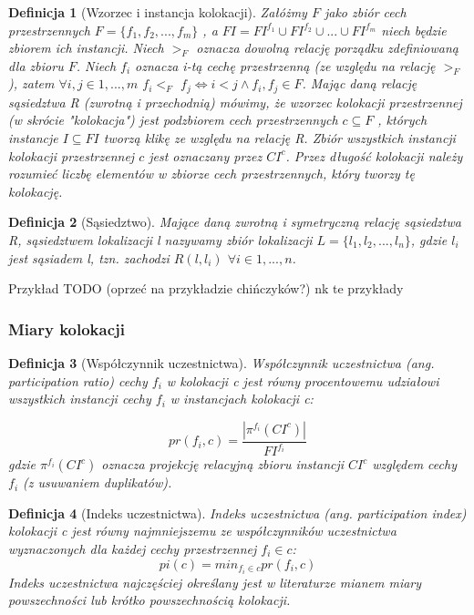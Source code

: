 \documentclass[12pt]{article}
\newtheorem{defin}{Definicja}
\begin{document}
\begin{defin}[Wzorzec i instancja kolokacji]
Załóżmy $F$ jako zbiór cech przestrzennych $F = \{ f_{1}, f_{2}, ...,f_{m} \} $ , a $FI = FI^{f_{1}} \cup FI^{f_{2}} \cup ... \cup FI^{f_{m}}$ niech będzie
zbiorem ich instancji. Niech $ >_{F} $ oznacza dowolną relację porządku zdefiniowaną dla zbioru $ F $. Niech $ f_{i} $ oznacza i-tą cechę przestrzenną (ze względu na relację $ >_{F} $), zatem $ \forall i,j \in 1,...,m $ $ f_{i} <_{F} $ $ f_{j} \Leftrightarrow i < j \land f_{i},f_{j} \in F $. Mając daną relację sąsiedztwa R (zwrotną i przechodnią) mówimy, że wzorzec kolokacji przestrzennej (w skrócie "kolokacja") jest podzbiorem cech przestrzennych $ c \subseteq F $ , których instancje $ I\subseteq FI $ tworzą klikę ze względu na relację R. Zbiór wszystkich instancji kolokacji przestrzennej $c$ jest oznaczany przez $CI^{c} $. Przez długość kolokacji należy rozumieć liczbę elementów w zbiorze cech przestrzennych, który tworzy tę kolokację.
\end{defin}

\begin{defin}[Sąsiedztwo]
Mające daną zwrotną i symetryczną relację sąsiedztwa R, sąsiedztwem lokalizacji l nazywamy zbiór lokalizacji $L = \{l_{1},l_{2}, . . . , l_{n}\}$, gdzie $l_{i}$ jest sąsiadem l, tzn. zachodzi $R(l, l_{i}) $ $ \forall i \in 1,...,n$.
\end{defin}

Przykład TODO (oprzeć na przykładzie chińczyków?) nk te przykłady

\subsubsection{Miary kolokacji}

\begin{defin}[Współczynnik uczestnictwa]
Współczynnik uczestnictwa (ang. participation ratio) cechy $ f_{i} $ w kolokacji c jest równy procentowemu udziałowi wszystkich instancji cechy $ f_{i} $ w instancjach kolokacji c:

\begin{equation}
pr(f_{i}, c) = \frac{|\pi^{f_{i}}(CI^{c})|}{FI^{f_{i}}}
\end{equation}
gdzie $ \pi^{f_{i}}(CI^{c})$ oznacza projekcję relacyjną zbioru instancji $ CI^{c}$ względem cechy $f_{i}$ (z usuwaniem duplikatów).
\end{defin}

\begin{defin}[Indeks uczestnictwa]Indeks uczestnictwa (ang. participation index) kolokacji c jest równy najmniejszemu ze współczynników uczestnictwa wyznaczonych dla każdej cechy przestrzennej $ f_{i} \in c$:
\begin{equation}
pi(c) = min_{f_{i} \in c} pr(f_{i} ,c)
\end{equation}
Indeks uczestnictwa najczęściej określany jest w literaturze mianem miary powszechności lub krótko powszechnością kolokacji.
\label{def:prevalence}
\end{defin}
\end{document}
